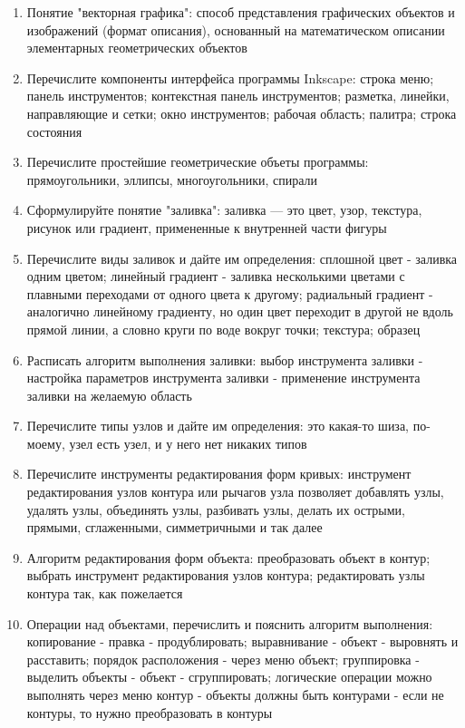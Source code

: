 \documentclass{article}
\begin{document}
\begin{enumerate}
    \item Понятие "векторная графика": способ представления графических объектов и изображений (формат описания), основанный на математическом описании элементарных геометрических объектов
    \item Перечислите компоненты интерфейса программы Inkscape: строка меню; панель инструментов; контекстная панель инструментов; разметка, линейки, направляющие и сетки; окно инструментов; рабочая область; палитра; строка состояния
    \item Перечислите простейшие геометрические объеты программы: прямоугольники, эллипсы, многоугольники, спирали
    \item Сформулируйте понятие "заливка": заливка — это цвет, узор, текстура, рисунок или градиент, примененные к внутренней части фигуры
    \item Перечислите виды заливок и дайте им определения: сплошной цвет - заливка одним цветом; линейный градиент - заливка несколькими цветами с плавными переходами от одного цвета к другому; радиальный градиент - аналогично линейному градиенту, но один цвет переходит в другой не вдоль прямой линии, а словно круги по воде вокруг точки; текстура; образец
    \item Расписать алгоритм выполнения заливки: выбор инструмента заливки - настройка параметров инструмента заливки - применение инструмента заливки на желаемую область
    \item Перечислите типы узлов и дайте им определения: это какая-то шиза, по-моему, узел есть узел, и у него нет никаких типов
    \item Перечислите инструменты редактирования форм кривых: инструмент редактирования узлов контура или рычагов узла позволяет добавлять узлы, удалять узлы, объединять узлы, разбивать узлы, делать их острыми, прямыми, сглаженными, симметричными и так далее
    \item Алгоритм редактирования форм объекта: преобразовать объект в контур; выбрать инструмент редактирования узлов контура; редактировать узлы контура так, как пожелается
    \item Операции над объектами, перечислить и пояснить алгоритм выполнения: копирование - правка - продублировать; выравнивание - объект - выровнять и расставить; порядок расположения - через меню объект; группировка - выделить объекты - объект - сгруппировать; логические операции можно выполнять через меню контур - объекты должны быть контурами - если не контуры, то нужно преобразовать в контуры
\end{enumerate}
\end{document}
